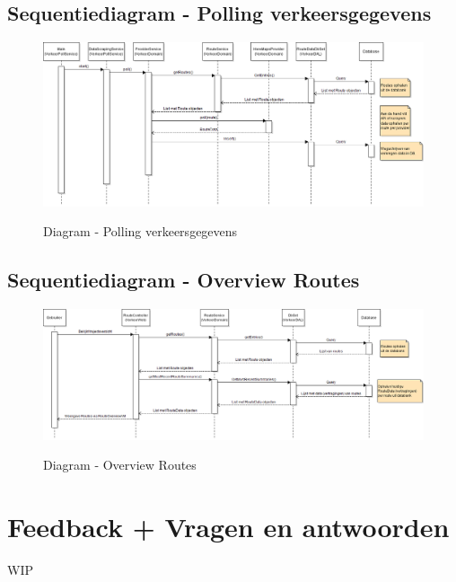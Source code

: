 \documentclass[a4paper]{article}
\begin{document}
\subsection{Sequentiediagram - Polling verkeersgegevens}

\begin{figure}[H]
\centering
\includegraphics[angle=90, scale=0.4]{images/PollServiceAPIcalls.png}\\
\caption{Diagram - Polling verkeersgegevens}
\end{figure}


\subsection{Sequentiediagram - Overview Routes}

\begin{figure}[H]
\centering
\includegraphics[angle=90, scale=0.4]{images/OverviewRoutes.png}\\
\caption{Diagram - Overview Routes}
\end{figure}

\newpage

\section{Feedback + Vragen en antwoorden}

WIP

\end{document}
